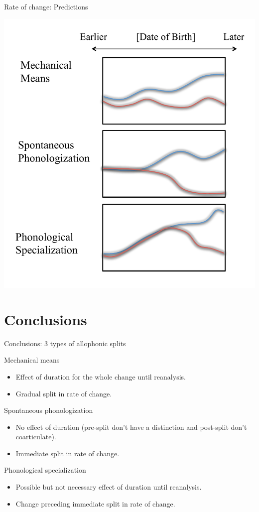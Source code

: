 \documentclass[hyperref={pdfpagelabels=false}]{beamer}
\begin{document}
\begin{frame}{Rate of change: Predictions}
	\begin{center}
	\includegraphics[width=.65\textwidth]{rocpred.pdf}
	\end{center}
\end{frame}


\section{Conclusions}

\begin{frame}{Conclusions: 3 types of allophonic splits}
	\begin{block}{Mechanical means}
		\begin{itemize}
			\item Effect of duration for the whole change until reanalysis.
			\item Gradual split in rate of change. \pause
		\end{itemize}
	\end{block}
	
	\begin{block}{Spontaneous phonologization}
		\begin{itemize}
			\item No effect of duration (pre-split don't have a distinction and post-split don't coarticulate).
			\item Immediate split in rate of change. \pause
		\end{itemize}
	\end{block}
	
	\begin{block}{Phonological specialization}
		\begin{itemize}
			\item Possible but not necessary effect of duration until reanalysis.
			\item Change preceding immediate split in rate of change.
		\end{itemize}
	\end{block}
\end{frame}
\end{document}
